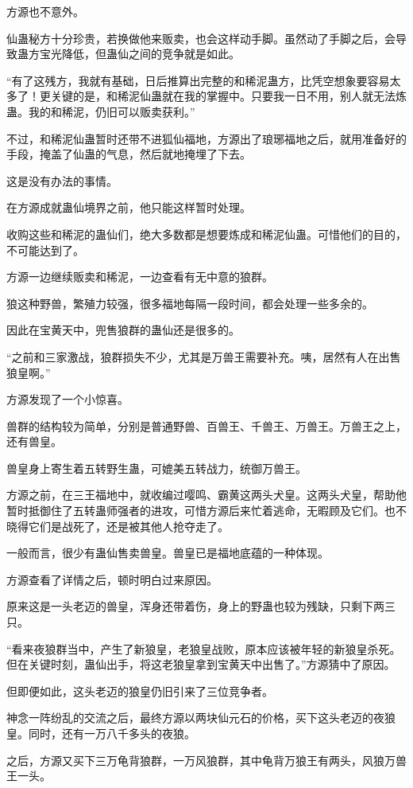 \begin{this_body}
方源也不意外。

仙蛊秘方十分珍贵，若换做他来贩卖，也会这样动手脚。虽然动了手脚之后，会导致蛊方宝光降低，但蛊仙之间的竞争就是如此。

“有了这残方，我就有基础，日后推算出完整的和稀泥蛊方，比凭空想象要容易太多了！更关键的是，和稀泥仙蛊就在我的掌握中。只要我一日不用，别人就无法炼蛊。我的和稀泥，仍旧可以贩卖获利。”

不过，和稀泥仙蛊暂时还带不进狐仙福地，方源出了琅琊福地之后，就用准备好的手段，掩盖了仙蛊的气息，然后就地掩埋了下去。

这是没有办法的事情。

在方源成就蛊仙境界之前，他只能这样暂时处理。

收购这些和稀泥的蛊仙们，绝大多数都是想要炼成和稀泥仙蛊。可惜他们的目的，不可能达到了。

方源一边继续贩卖和稀泥，一边查看有无中意的狼群。

狼这种野兽，繁殖力较强，很多福地每隔一段时间，都会处理一些多余的。

因此在宝黄天中，兜售狼群的蛊仙还是很多的。

“之前和三家激战，狼群损失不少，尤其是万兽王需要补充。咦，居然有人在出售狼皇啊。”

方源发现了一个小惊喜。

兽群的结构较为简单，分别是普通野兽、百兽王、千兽王、万兽王。万兽王之上，还有兽皇。

兽皇身上寄生着五转野生蛊，可媲美五转战力，统御万兽王。

方源之前，在三王福地中，就收编过嘤鸣、霸黄这两头犬皇。这两头犬皇，帮助他暂时抵御住了五转蛊师强者的进攻，可惜方源后来忙着逃命，无暇顾及它们。也不晓得它们是战死了，还是被其他人抢夺走了。

一般而言，很少有蛊仙售卖兽皇。兽皇已是福地底蕴的一种体现。

方源查看了详情之后，顿时明白过来原因。

原来这是一头老迈的兽皇，浑身还带着伤，身上的野蛊也较为残缺，只剩下两三只。

“看来夜狼群当中，产生了新狼皇，老狼皇战败，原本应该被年轻的新狼皇杀死。但在关键时刻，蛊仙出手，将这老狼皇拿到宝黄天中出售了。”方源猜中了原因。

但即便如此，这头老迈的狼皇仍旧引来了三位竞争者。

神念一阵纷乱的交流之后，最终方源以两块仙元石的价格，买下这头老迈的夜狼皇。同时，还有一万八千多头的夜狼。

之后，方源又买下三万龟背狼群，一万风狼群，其中龟背万狼王有两头，风狼万兽王一头。


\end{this_body}
